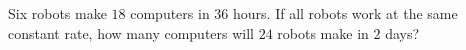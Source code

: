 Six robots make $18$ computers in $36$ hours. If all robots work at the same constant rate, how many computers will $24$ robots make in $2$ days?
